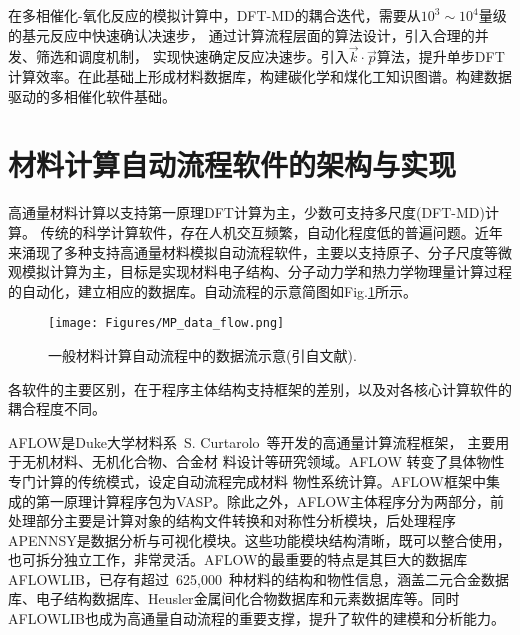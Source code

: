 在多相催化-氧化反应的模拟计算中，\textrm{DFT-MD}的耦合迭代，需要从$10^3\sim10^4$量级的基元反应中快速确认决速步，%
通过计算流程层面的算法设计，引入合理的并发、筛选和调度机制，%
实现快速确定反应决速步。引入$\vec k\cdot\vec p$算法，提升单步\textrm{DFT}计算效率。在此基础上形成材料数据库，构建碳化学和煤化工知识图谱。构建数据驱动的多相催化软件基础。

\section{材料计算自动流程软件的架构与实现}
高通量材料计算以支持第一原理\textrm{DFT}计算为主，少数可支持多尺度\textrm{(DFT-MD)}计算。%
传统的科学计算软件，存在人机交互频繁，自动化程度低的普遍问题。近年来涌现了多种支持高通量材料模拟自动流程软件，主要以支持原子、分子尺度等微观模拟计算为主，目标是实现材料电子结构、分子动力学和热力学物理量计算过程的自动化，建立相应的数据库。自动流程的示意简图如\textrm{Fig.}\ref{Fig:MP_data_flow}所示。
\begin{figure}[h!]
\centering
\texttt{[image: Figures/MP\_data\_flow.png]}%
\caption{一般材料计算自动流程中的数据流示意(引自文献\cite{CMS49-299_2010}).}%
\label{Fig:MP_data_flow}
\end{figure}
各软件的主要区别，在于程序主体结构支持框架的差别，以及对各核心计算软件的耦合程度不同。

\textrm{AFLOW}是\textrm{Duke}大学材料系~\textrm{S. Curtarolo}~等开发的高通量计算流程框架，%
主要用于无机材料、无机化合物、合金材 料设计等研究领域。AFLOW 转变了具体物性专门计算的传统模式，设定自动流程完成材料 物性系统计算。\textrm{AFLOW}框架中集成的第一原理计算程序包为\textrm{VASP}。除此之外，\textrm{AFLOW}主体程序分为两部分，前处理部分主要是计算对象的结构文件转换和对称性分析模块，后处理程序\textrm{APENNSY}是数据分析与可视化模块。这些功能模块结构清晰，既可以整合使用，也可拆分独立工作，非常灵活。\textrm{AFLOW}的最重要的特点是其巨大的数据库\textrm{AFLOWLIB}，已存有超过~625,000~种材料的结构和物性信息，涵盖二元合金数据库、电子结构数据库、\textrm{Heusler}金属间化合物数据库和元素数据库等。同时\textrm{AFLOWLIB}也成为高通量自动流程的重要支撑，提升了软件的建模和分析能力。

